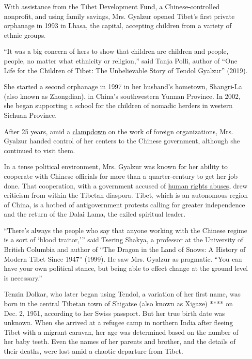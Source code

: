 With assistance from the Tibet Development Fund, a Chinese-controlled
nonprofit, and using family savings, Mrs. Gyalzur opened Tibet's first
private orphanage in 1993 in Lhasa, the capital, accepting children from
a variety of ethnic groups.

``It was a big concern of hers to show that children are children and
people, people, no matter what ethnicity or religion,'' said Tanja
Polli, author of ``One Life for the Children of Tibet: The Unbelievable
Story of Tendol Gyalzur'' (2019).

She started a second orphanage in 1997 in her husband's hometown,
Shangri-La (also known as Zhongdian), in China's southwestern Yunnan
Province. In 2002, she began supporting a school for the children of
nomadic herders in western Sichuan Province.

After 25 years, amid a
\href{https://www.nytimes3xbfgragh.onion/2016/04/29/world/asia/china-foreign-ngo-law.html}{clampdown}
on the work of foreign organizations, Mrs. Gyalzur handed control of her
centers to the Chinese government, although she continued to visit them.

In a tense political environment, Mrs. Gyalzur was known for her ability
to cooperate with Chinese officials for more than a quarter-century to
get her job done. That cooperation, with a government accused of
\href{https://www.nytimes3xbfgragh.onion/2012/11/03/world/asia/un-rights-official-faults-china-on-tibetan-suppression.html}{human
rights abuses}, drew criticism from within the Tibetan diaspora. Tibet,
which is an autonomous region of China, is a hotbed of antigovernment
protests calling for greater independence and the return of the Dalai
Lama, the exiled spiritual leader.

``There's always the people who say that anyone working with the Chinese
regime is a sort of `blood traitor,''' said Tsering Shakya, a professor
at the University of British Columbia and author of ``The Dragon in the
Land of Snows: A History of Modern Tibet Since 1947'' (1999). He saw
Mrs. Gyalzur as pragmatic. ``You can have your own political stance, but
being able to effect change at the ground level is necessary.''

Tenzin Dolkar, who later began using Tendol, a variation of her first
name, was born in the central Tibetan town of Shigatse (also known as
Xigaze) **** on Dec. 2, 1951, according to her Swiss passport. But her
true birth date was unknown. When she arrived at a refugee camp in
northern India after fleeing Tibet with a migrant caravan, her age was
determined based on the number of her baby teeth. Even the names of her
parents and brother, and the details of their deaths, were lost amid a
chaotic departure from Tibet.

